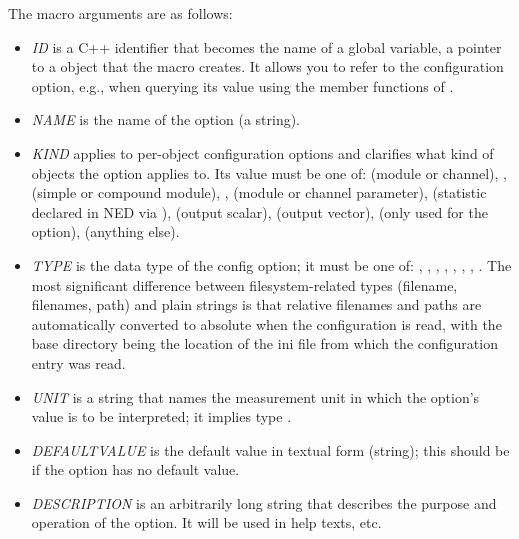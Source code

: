 The macro arguments are as follows:
\begin{itemize}
  \item \textit{ID} is a C++ identifier that becomes the name of a global
        variable, a pointer to a  object that the
        macro creates. It allows you to refer to the configuration option,
        e.g., when querying its value using the member functions of .
  \item \textit{NAME} is the name of the option (a string).
  \item \textit{KIND} applies to per-object configuration options and
        clarifies what kind of objects the option applies to. Its value
        must be one of:  (module or channel),
        ,  (simple or compound module),
        ,  (module or channel
        parameter),  (statistic declared in NED
        via ),  (output scalar),
         (output vector), 
        (only used for the  option), 
        (anything else).
  \item \textit{TYPE} is the data type of the config option; it must be one of:
        , , , ,
        , , , .
        The most significant difference between filesystem-related types
        (filename, filenames, path) and plain strings is that relative
        filenames and paths are automatically converted to absolute
        when the configuration is read, with the base directory being the
        location of the ini file from which the configuration entry was read.
  \item \textit{UNIT} is a string that names the measurement unit in which
        the option's value is to be interpreted; it implies type .
  \item \textit{DEFAULTVALUE} is the default value in textual form (string);
        this should be  if the option has no default value.
  \item \textit{DESCRIPTION} is an arbitrarily long string that describes
        the purpose and operation of the option. It will be used in
        help texts, etc.
\end{itemize}

